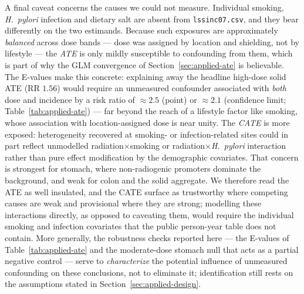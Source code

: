 \documentclass[11pt]{article}
\begin{document}
A final caveat concerns the causes we could not measure. Individual smoking,
\emph{H.\ pylori} infection and dietary salt are absent from
\texttt{lssinc07.csv}, and they bear differently on the two estimands. Because
such exposures are approximately \emph{balanced} across dose bands --- dose was
assigned by location and shielding, not by lifestyle --- the \emph{ATE} is
only mildly susceptible to confounding from them, which is part of why the
GLM convergence of Section~\ref{sec:applied-ate} is believable. The E-values
make this concrete: explaining away the headline high-dose solid ATE (RR
$1.56$) would require an unmeasured confounder associated with \emph{both}
dose and incidence by a risk ratio of $\approx 2.5$ (point) or $\approx 2.1$
(confidence limit; Table~\ref{tab:applied-ate}) --- far beyond the reach of a
lifestyle factor like smoking, whose association with location-assigned dose
is near unity. The \emph{CATE} is more exposed: heterogeneity recovered at smoking- or
infection-related sites could in part reflect unmodelled
radiation$\times$smoking or radiation$\times$\emph{H.\ pylori} interaction
rather than pure effect modification by the demographic covariates. That
concern is strongest for stomach, where non-radiogenic promoters dominate the
background, and weak for colon and the solid aggregate. We therefore read the
ATE as well insulated, and the CATE surface as trustworthy where competing
causes are weak and provisional where they are strong; modelling these
interactions directly, as opposed to caveating them, would require the
individual smoking and infection covariates that the public person-year table
does not contain. More generally, the robustness checks reported here ---
the E-values of Table~\ref{tab:applied-ate} and the moderate-dose stomach null
that acts as a partial negative control --- serve to \emph{characterize} the
potential influence of unmeasured confounding on these conclusions, not to
eliminate it; identification still rests on the assumptions stated in
Section~\ref{sec:applied-design}.


\clearpage


\end{document}

